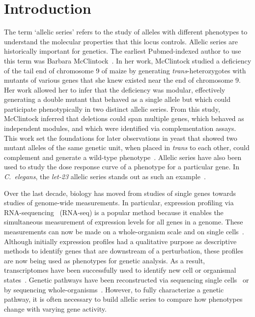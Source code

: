 \documentclass[10pt, twocolumn]{article}
\newcommand{\cel}{\emph{C.~elegans}}
\newcommand{\gene}[1]{\mbox{\emph{#1}}}
\begin{document}
\linenumbers{}

\section*{Introduction}
The term `allelic series' refers to the study of alleles with different
phenotypes to understand the molecular properties that this locus controls.
Allelic series are historically important for genetics. The earliest
Pubmed-indexed author to use this term was Barbara
McClintock~\cite{McClintock1944}. In her work, McClintock studied a deficiency
of the tail end of chromosome 9 of maize by generating \emph{trans}-heterozygotes with
mutants of various genes that she knew existed near the end of chromosome 9. Her
work allowed her to infer that the deficiency was modular, effectively
generating a double mutant that behaved as a single allele but which could
participate phenotypically in two distinct allelic series. From this study,
McClintock inferred that deletions could span multiple genes, which behaved
as independent modules, and which were identified via complementation assays.
This work set the foundations for later observations in yeast
that showed two mutant alleles of the same genetic unit, when placed in
\emph{trans} to each other, could complement and generate a wild-type
phenotype~\cite{FINCHAM1957}. Allelic series have also been used to study the
dose response curve of a phenotype for a particular gene. In \cel{}, the
\gene{let-23} allelic series stands out as such an example~\cite{}.

Over the last decade, biology has moved from studies of single genes towards
studies of genome-wide measurements. In particular, expression profiling via
RNA-sequencing~\cite{Mortazavi2008} (RNA-seq) is a popular method because it
enables the simultaneous measurement of expression levels for all genes in a
genome. These measurements can now be made on a whole-organism scale and on
single cells~\cite{Tang2009}. Although initially expression profiles had a
qualitative purpose as descriptive methods to identify genes that are downstream
of a perturbation, these profiles are now being used as phenotypes for genetic
analysis. As a result, transcriptomes have been successfully used to identify
new cell or organismal states~\cite{Angeles-Albores2017,Villani2017}. Genetic
pathways have been reconstructed via sequencing single cells~\cite{Dixit2016} or
by sequencing whole-organisms~\cite{}. However, to fully characterize a genetic
pathway, it is often necessary to build allelic series to compare how phenotypes
change with varying gene activity.
\end{document}
